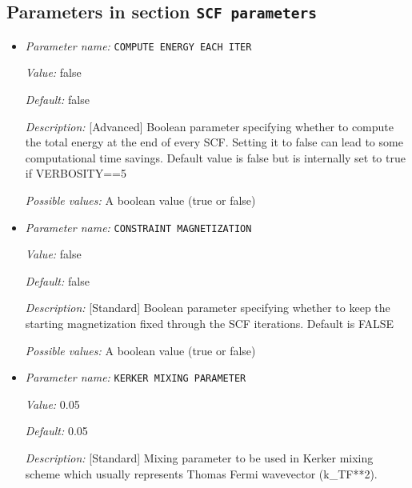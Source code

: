 \subsection{Parameters in section \tt SCF parameters}
\label{parameters:SCF_20parameters}

\begin{itemize}
\item {\it Parameter name:} {\tt COMPUTE ENERGY EACH ITER}
\label{parameters:SCF parameters/COMPUTE ENERGY EACH ITER}
\label{parameters:SCF_20parameters/COMPUTE_20ENERGY_20EACH_20ITER}


{\it Value:} false


{\it Default:} false


{\it Description:} [Advanced] Boolean parameter specifying whether to compute the total energy at the end of every SCF. Setting it to false can lead to some computational time savings. Default value is false but is internally set to true if VERBOSITY==5


{\it Possible values:} A boolean value (true or false)
\item {\it Parameter name:} {\tt CONSTRAINT MAGNETIZATION}
\label{parameters:SCF parameters/CONSTRAINT MAGNETIZATION}
\label{parameters:SCF_20parameters/CONSTRAINT_20MAGNETIZATION}


{\it Value:} false


{\it Default:} false


{\it Description:} [Standard] Boolean parameter specifying whether to keep the starting magnetization fixed through the SCF iterations. Default is FALSE


{\it Possible values:} A boolean value (true or false)
\item {\it Parameter name:} {\tt KERKER MIXING PARAMETER}
\label{parameters:SCF parameters/KERKER MIXING PARAMETER}
\label{parameters:SCF_20parameters/KERKER_20MIXING_20PARAMETER}


{\it Value:} 0.05


{\it Default:} 0.05


{\it Description:} [Standard] Mixing parameter to be used in Kerker mixing scheme which usually represents Thomas Fermi wavevector (k\_{TF}**2).



\end{itemize}
